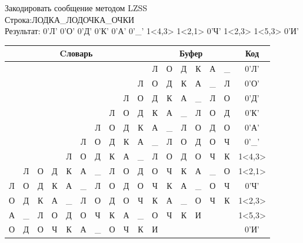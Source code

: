 \documentclass[a4paper, 12pt]{article}
\begin{document}
Закодировать сообщение методом LZSS\\
Строка:ЛОДКА\_ЛОДОЧКА\_ОЧКИ\\
Результат: 0'Л' 0'О' 0'Д' 0'К' 0'А' 0'\_' 1<4,3> 1<2,1> 0'Ч' 1<2,3> 1<5,3> 0'И'\\
\begin{table}[h!]
\centering
\begin{tabular}{|c|c|c|c|c|c|c|c|c|c|c|c|c|c|c|c|c|}
\hline
\multicolumn{10}{|c|}{Cловарь} & \multicolumn{6}{c|}{Буфер} & Код  \\ \hline
  &   &   &   &   &   &   &   &   &   & Л & О & Д & К & А & \_ & 0'Л'\\ \hline
  &   &   &   &   &   &   &   &   & Л & О & Д & К & А & \_ & Л & 0'О'\\ \hline
  &   &   &   &   &   &   &   & Л & О & Д & К & А & \_ & Л & О & 0'Д'\\ \hline
  &   &   &   &   &   &   & Л & О & Д & К & А & \_ & Л & О & Д & 0'К'\\ \hline
  &   &   &   &   &   & Л & О & Д & К & А & \_ & Л & О & Д & О & 0'А'\\ \hline
  &   &   &   &   & Л & О & Д & К & А & \_ & Л & О & Д & О & Ч & 0'\_'\\ \hline
  &   &   &   & \cellcolor[HTML]{FFFF00} Л & \cellcolor[HTML]{FFFF00} О & \cellcolor[HTML]{FFFF00} Д & К & А & \_ & \cellcolor[HTML]{FFFF00} Л & \cellcolor[HTML]{FFFF00} О & \cellcolor[HTML]{FFFF00} Д & О & Ч & К & 1<4,3>\\ \hline
  & Л & \cellcolor[HTML]{FFFF00} О & Д & К & А & \_ & Л & О & Д & \cellcolor[HTML]{FFFF00} О & Ч & К & А & \_ & О & 1<2,1>\\ \hline
Л & О & Д & К & А & \_ & Л & О & Д & О & Ч & К & А & \_ & О & Ч & 0'Ч'\\ \hline
О & Д & \cellcolor[HTML]{FFFF00} К & \cellcolor[HTML]{FFFF00} А & \cellcolor[HTML]{FFFF00} \_ & Л & О & Д & О & Ч & \cellcolor[HTML]{FFFF00} К & \cellcolor[HTML]{FFFF00} А & \cellcolor[HTML]{FFFF00} \_ & О & Ч & К & 1<2,3>\\ \hline
А & \_ & Л & О & Д & \cellcolor[HTML]{FFFF00} О & \cellcolor[HTML]{FFFF00} Ч & \cellcolor[HTML]{FFFF00} К & А & \_ & \cellcolor[HTML]{FFFF00} О & \cellcolor[HTML]{FFFF00} Ч & \cellcolor[HTML]{FFFF00} К & И &   &   & 1<5,3>\\ \hline
О & Д & О & Ч & К & А & \_ & О & Ч & К & И &   &   &   &   &   & 0'И'\\ \hline
\end{tabular}
\end{table}
\end{document}
